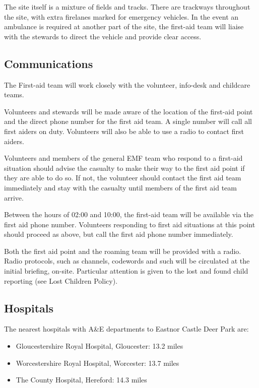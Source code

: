 The site itself is a mixture of fields and tracks. There are
trackways throughout the site, with extra firelanes marked for emergency
vehicles. In the event an ambulance is required at another part of the site,
the first-aid team will liaise with the stewards to direct the vehicle and
provide clear access.

\subsection{Communications}

The First-aid team will work closely with the volunteer, info-desk and childcare
teams.

Volunteers and stewards will be made aware of the location of the first-aid
point and the direct phone number for the first aid team. A single number will 
call all first aiders on duty. Volunteers will also be able to use a radio to 
contact first aiders.

Volunteers and members of the general EMF team who respond to a first-aid
situation should advise the casualty to make their way to the first aid point
if they are able to do so. If not, the volunteer should contact the first aid
team immediately and stay with the casualty until members of the first aid team
arrive.

Between the hours of 02:00 and 10:00, the first-aid team will be available via the
first aid phone number. Volunteers responding to first aid situations at this
point should proceed as above, but call the first aid phone number
immediately.

Both the first aid point and the roaming team will be provided with a radio.
Radio protocols, such as channels, codewords and such will be circulated at the
initial briefing, on-site. Particular attention is given to the lost and found
child reporting (see Lost Children Policy).

\subsection{Hospitals}

The nearest hospitals with A\&E departments to Eastnor Castle Deer Park are:

\begin{itemize}
    \tightlist
\item Gloucestershire Royal Hospital, Gloucester: 13.2 miles
\item Worcestershire Royal Hospital, Worcester: 13.7 miles
\item The County Hospital, Hereford: 14.3 miles
\end{itemize}

